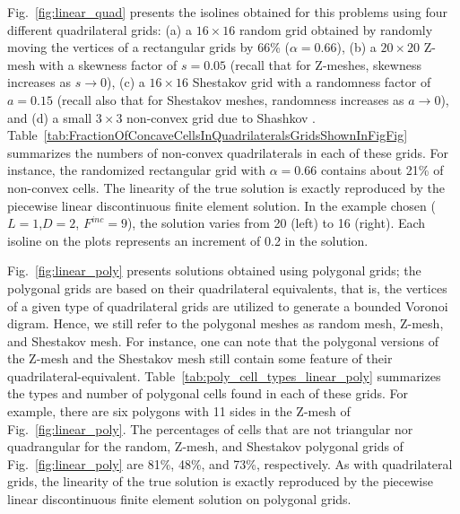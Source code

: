 \documentclass[preprint,10pt]{elsarticle}
\newcommand{\fig}[1]{Fig.~\ref{#1}}                      %
\newcommand{\tbl}[1]{Table~\ref{#1}}                     %
\begin{document}
\fig{fig:linear_quad} presents the isolines obtained for this problems using four different quadrilateral grids:
(a) a $16 \times 16$ random grid obtained by randomly moving the vertices of a rectangular grids by 66\% ($\alpha=0.66$), 
(b) a $20 \times 20$ Z-mesh with a skewness factor of $s=0.05$ (recall that for Z-meshes, skewness increases
as $s\to 0$), 
(c) a $16 \times 16$ Shestakov grid  with a randomness factor of $a=0.15$ (recall also that for Shestakov meshes, 
randomness increases as $a\to 0$), and 
(d) a small $3 \times 3$ non-convex grid due to Shashkov \cite{ShashkovSteinberg1996}.
\tbl{tab:FractionOfConcaveCellsInQuadrilateralsGridsShownInFigFig} summarizes the numbers of non-convex quadrilaterals in each of these grids.  For instance, the randomized rectangular grid with $\alpha=0.66$ contains about 21\% of non-convex cells. 
The linearity of the true solution is exactly reproduced by the piecewise linear discontinuous finite element solution. In the example chosen ($L=1$,$D=2$, $F^{inc}=9$), the solution varies from 20 (left) to 16 (right). Each isoline on the plots represents an increment of 0.2 in the solution.

\fig{fig:linear_poly} presents solutions obtained using polygonal grids; the polygonal grids are based on their quadrilateral equivalents, that is, the vertices of a given type of quadrilateral grids are utilized to generate a bounded Voronoi digram. Hence, we still refer to the polygonal meshes as random mesh, Z-mesh, and Shestakov mesh. For instance, one can note that the polygonal versions of the Z-mesh and the Shestakov mesh still contain some feature of their quadrilateral-equivalent. \tbl{tab:poly_cell_types_linear_poly} summarizes the types and number of polygonal cells found in each of these grids. 
For example, there are six polygons with 11 sides in the Z-mesh of \fig{fig:linear_poly}. The percentages of cells that are not triangular nor quadrangular for the random, Z-mesh, and Shestakov polygonal grids of \fig{fig:linear_poly} are 81\%, 48\%, and 73\%, respectively. As with quadrilateral grids, the linearity of the true solution is exactly reproduced by the piecewise linear discontinuous finite element solution on polygonal grids.
\end{document}
